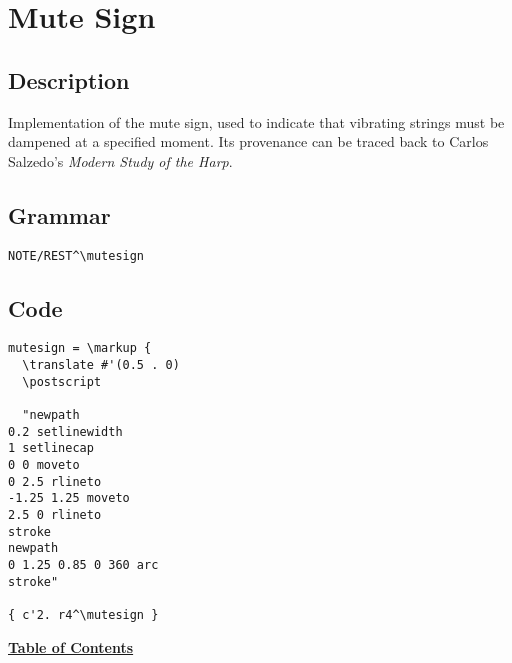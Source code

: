 \vfill \break







\section {Mute Sign}
\hfill

\subsection{Description}
Implementation of the mute sign, used to indicate that vibrating strings must be dampened at a specified moment. Its provenance can be traced back to Carlos Salzedo's \textit{Modern Study of the Harp}.\autocite[19]{RN4} 

\subsection{Grammar}
\begin{verbatim}
NOTE/REST^\mutesign
\end{verbatim}
\subsection{Code}
\begin{verbatim}
mutesign = \markup {
  \translate #'(0.5 . 0)
  \postscript

  "newpath
0.2 setlinewidth
1 setlinecap
0 0 moveto
0 2.5 rlineto
-1.25 1.25 moveto
2.5 0 rlineto
stroke
newpath
0 1.25 0.85 0 360 arc
stroke"

{ c'2. r4^\mutesign }

\end{verbatim}
\hyperref[sec:toc]{\textbf{Table of Contents}}

\vfill \break


